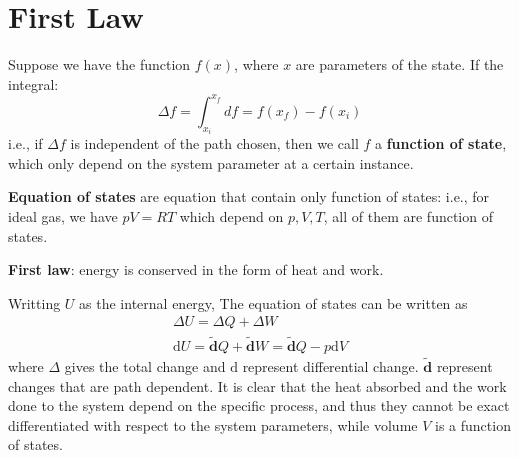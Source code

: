 \documentclass{article}
\newcommand{\dbar}{\mathbf{\tilde{d}}}
\newcommand{\dnor}{\text{d}}
\begin{document}
\section{First Law}
Suppose we have the function $f(x)$, where $x$ are parameters of the state. 
If the integral:
\begin{equation}
    \Delta f = \int_{x_i}^{x_f} df = f(x_f) - f(x_i) 
\end{equation}
i.e., if $\Delta f$ is independent of the path chosen, then we call $f$ a 
\textbf{function of state}, which only depend on the system parameter at a 
certain instance.

\textbf{Equation of states} are equation that contain only function of states:
i.e., for ideal gas, we have $pV = RT$ which depend on $p, V, T$, all of them are 
function of states.

\textbf{First law}: energy is conserved in the form of heat and work.

Writting $U$ as the internal energy, The equation of states can be written as
\begin{gather}
    \Delta U = \Delta Q + \Delta W \\
    \dnor U = \dbar Q + \dbar W = \dbar Q - p \dnor V
\end{gather}
where $\Delta$ gives the total change and $\dnor$ represent differential change. $\dbar$
represent changes that are path dependent. It is clear that 
the heat absorbed and the work done to the system depend on the specific process, and 
thus they cannot be exact differentiated with respect to the system parameters, while 
volume $V$ is a function of states.
\end{document}
